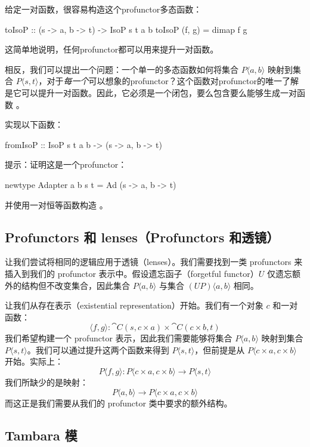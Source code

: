 \documentclass[DaoFP]{subfiles}
\begin{document}
给定一对函数，很容易构造这个profunctor多态函数：
\begin{haskell}
toIsoP :: (s -> a, b -> t) -> IsoP s t a b
toIsoP (f, g) = dimap f g
\end{haskell}
这简单地说明，任何profunctor都可以用来提升一对函数。

相反，我们可以提出一个问题：一个单一的多态函数如何将集合 $P \langle a, b \rangle$ 映射到集合 $P \langle s, t \rangle$，对于\emph{每一个}可以想象的profunctor？这个函数对profunctor的唯一了解是它可以提升一对函数。因此，它必须是一个闭包，要么包含要么能够生成一对函数 。

\begin{exercise}
实现以下函数：
\begin{haskell}
fromIsoP :: IsoP s t a b -> (s -> a, b -> t)
\end{haskell}
提示：证明这是一个profunctor：
\begin{haskell}
newtype Adapter a b s t = Ad (s -> a, b -> t)
\end{haskell}
并使用一对恒等函数构造 。
\end{exercise}

\subsection{Profunctors 和 lenses（Profunctors 和透镜）}

让我们尝试将相同的逻辑应用于透镜（lenses）。我们需要找到一类 profunctors 来插入到我们的 profunctor 表示中。假设遗忘函子（forgetful functor）$U$ 仅遗忘额外的结构但不改变集合，因此集合 $P \langle a, b \rangle$ 与集合 $(U P) \langle a, b \rangle$ 相同。

让我们从存在表示（existential representation）开始。我们有一个对象 $c$ 和一对函数：
\[  \langle f, g \rangle \colon \cat C(s, c \times a) \times \cat C(c \times b, t) \]
我们希望构建一个 profunctor 表示，因此我们需要能够将集合 $P \langle a, b \rangle$ 映射到集合 $P \langle s, t \rangle$。我们可以通过提升这两个函数来得到 $P \langle s, t \rangle$，但前提是从 $P \langle c \times a, c \times b \rangle$ 开始。实际上：
\[ P \langle f, g \rangle \colon P \langle c \times a, c \times b \rangle \to P \langle s, t \rangle \]
我们所缺少的是映射：
\[ P \langle a, b \rangle \to P \langle c \times a, c \times b \rangle \]
而这正是我们需要从我们的 profunctor 类中要求的额外结构。

\subsection{Tambara 模}
\end{document}
